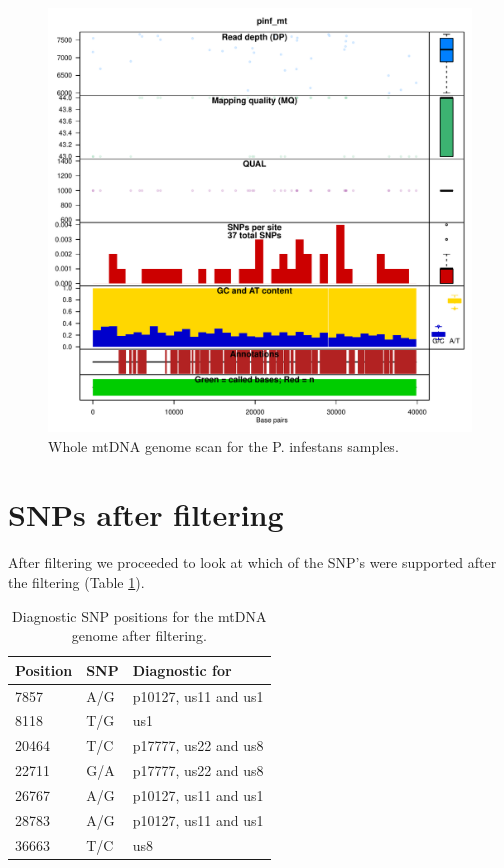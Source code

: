 \documentclass{article}\usepackage[]{graphicx}\usepackage[]{color}
\makeatletter
\def\maxwidth{ %
  \ifdim\Gin@nat@width>\linewidth
    \linewidth
  \else
    \Gin@nat@width
  \fi
}
\newenvironment{knitrout}{}{} %
\makeatother
\begin{document}
\begin{knitrout}
\color{fgcolor}\begin{figure}[h!]

\includegraphics[width=\maxwidth]{figure/chromogc} \caption[Whole mtDNA genome scan for the P]{Whole mtDNA genome scan for the P. infestans samples.\label{fig:chromogc}}
\end{figure}


\end{knitrout}



\section{SNPs after filtering}

After filtering we proceeded to look at which of the SNP's were supported after the filtering (Table \ref{table:DiagSNP}).

\begin{table}[h!]
\centering
\caption{Diagnostic SNP positions for the mtDNA genome after filtering.}
\begin{tabular}{@{}lll@{}}
\toprule
Position & SNP & Diagnostic for       \\ \midrule
7857     & A/G & p10127, us11 and us1 \\
8118     & T/G & us1                  \\
20464    & T/C & p17777, us22 and us8 \\
22711    & G/A & p17777, us22 and us8 \\
26767    & A/G & p10127, us11 and us1 \\
28783    & A/G & p10127, us11 and us1 \\
36663    & T/C & us8                  \\ \bottomrule
\end{tabular}
\label{table:DiagSNP}
\end{table}
\end{document}
